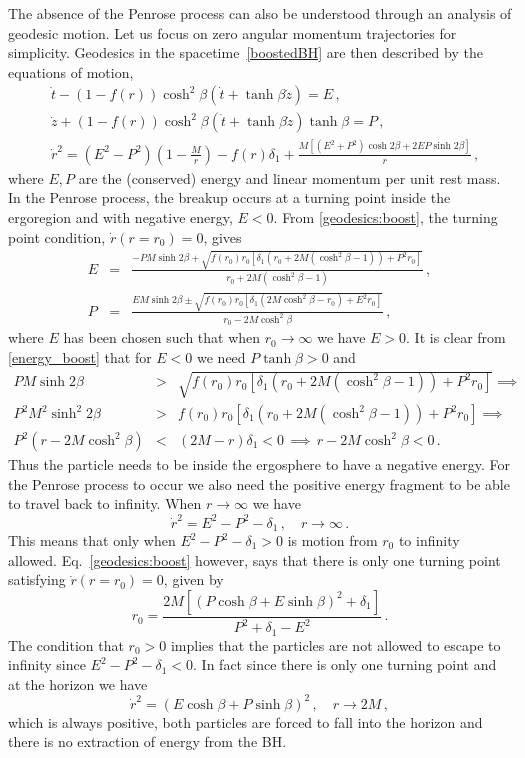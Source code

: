 \documentclass[11pt]{article}
\newcommand{\be}{\begin{equation}}
\newcommand{\ee}{\end{equation}}
\def\beq{\begin{eqnarray}}
\def\eeq{\end{eqnarray}}
\newcommand{\nn}{\nonumber}
\numberwithin{equation}{section} %
\begin{document}
The absence of the Penrose process can also be understood through an analysis of geodesic motion. Let us focus on zero angular momentum trajectories for simplicity.
Geodesics in the spacetime~\eqref{boostedBH} are then described by the equations of motion,
%
\beq
&\dot{t}-(1-f(r))\cosh^2\beta(\dot{t}+\tanh\beta \dot{z})=E\,,\label{geodesics:time_boost}\\
%
&\dot{z}+(1-f(r))\cosh^2\beta(\dot{t}+\tanh\beta \dot{z})\tanh\beta=P\,,\\
%
&\dot{r}^2=(E^2-P^2)\left(1-\frac{M}{r}\right)-f(r)\delta_1+\frac{M\left[\left(E^2+P^2\right)\cosh 2\beta+2 E P\sinh 2\beta\right]}{r}\,,\label{geodesics:boost}
\eeq
%
where $E,P$ are the (conserved) energy and linear momentum per unit rest mass.
In the Penrose process, the breakup occurs at a turning point inside the ergoregion and with negative energy, $E<0$. From \eqref{geodesics:boost}, the turning point condition, $\dot{r}(r=r_0)=0$, gives
%
\beq
E&=&\frac{-P M \sinh 2\beta+\sqrt{f(r_0)r_0\left[\delta_1(r_0+2M(\cosh^2\beta-1))+P^2r_0\right]}}{r_0+2M(\cosh^2\beta-1)}\,,\label{energy_boost}\\
P&=&\frac{E M \sinh 2\beta\pm\sqrt{f(r_0)r_0\left[\delta_1(2M\cosh^2\beta-r_0)+E^2 r_0\right]}}{r_0-2M\cosh^2\beta}\,,\label{momentum_boost}
\eeq
%
where $E$ has been chosen such that when $r_0\to \infty$ we have $E>0$. It is clear from \eqref{energy_boost} that for $E<0$ we need $P\tanh\beta>0$ and
%
\beq
P M \sinh 2\beta&>&\sqrt{f(r_0)r_0\left[\delta_1(r_0+2M(\cosh^2\beta-1))+P^2 r_0\right]} \implies\nn\\
P^2 M^2 \sinh^2 2\beta&>&f(r_0)r_0\left[\delta_1(r_0+2M(\cosh^2\beta-1))+P^2 r_0\right] \implies\nn\\
P^2(r-2M\cosh^2\beta)&<&(2M-r)\delta_1<0 \,\implies \, r-2M\cosh^2\beta<0\,.
\eeq
% 
Thus the particle needs to be inside the ergosphere to have a negative energy.	
For the Penrose process to occur we also need the positive energy fragment to be able to travel back to infinity. When $r\to\infty$ we have
%
%
\be
\dot{r}^2=E^2-P^2-\delta_1\,,\quad r\to\infty\,.
\ee
%
This means that only when $E^2-P^2-\delta_1>0$ is motion from $r_0$ to infinity allowed. Eq.~\eqref{geodesics:boost} however, says that there is only one turning point satisfying $\dot{r}(r=r_0)=0$, given by
%
\be
r_0=\frac{2M\left[(P\cosh\beta+E\sinh\beta)^2+\delta_1\right]}{P^2+\delta_1-E^2}\,.
\ee
%
The condition that $r_0>0$ implies that the particles are not allowed to escape to infinity since $E^2-P^2-\delta_1<0$. In fact since there is only one turning point and at the horizon we have
%
\be
\dot{r}^2=(E\cosh\beta+P\sinh\beta)^2 \,,\quad r\to 2M\,,
\ee
%
which is always positive, both particles are forced to fall into the horizon and there is no extraction of energy from the BH.
\end{document}
